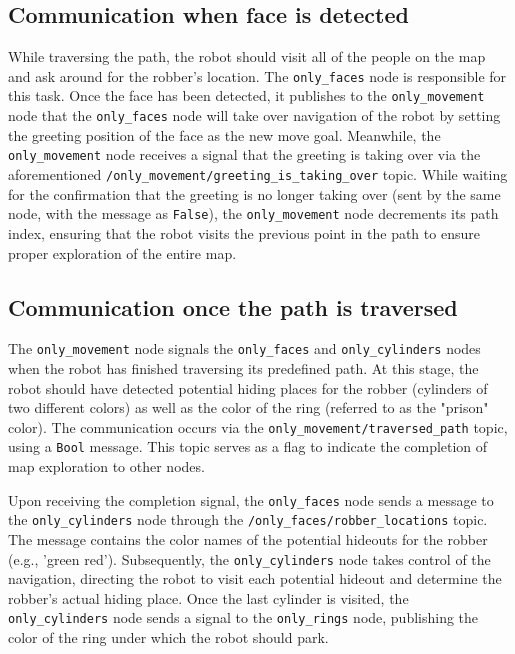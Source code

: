 \documentclass{article}
\begin{document}
\subsection{Communication when face is detected}

While traversing the path, the robot should visit all of the people on the map and ask around for the robber's location. The \texttt{only\_faces} node is responsible for this task. Once the face has been detected, it publishes to the \texttt{only\_movement} node that the \texttt{only\_faces} node will take over navigation of the robot by setting the greeting position of the face as the new move goal. Meanwhile, the \texttt{only\_movement} node receives a signal that the greeting is taking over via the aforementioned \texttt{/only\_movement/greeting\_is\_taking\_over} topic. While waiting for the confirmation that the greeting is no longer taking over (sent by the same node, with the message as \texttt{False}), the \texttt{only\_movement} node decrements its path index, ensuring that the robot visits the previous point in the path to ensure proper exploration of the entire map.


\subsection{Communication once the path is traversed}

The \texttt{only\_movement} node signals the \texttt{only\_faces} and \texttt{only\_cylinders} nodes when the robot has finished traversing its predefined path. At this stage, the robot should have detected potential hiding places for the robber (cylinders of two different colors) as well as the color of the ring (referred to as the "prison" color). The communication occurs via the \texttt{only\_movement/traversed\_path} topic, using a \texttt{Bool} message. This topic serves as a flag to indicate the completion of map exploration to other nodes.

Upon receiving the completion signal, the \texttt{only\_faces} node sends a message to the \texttt{only\_cylinders} node through the \texttt{/only\_faces/robber\_locations} topic. The message contains the color names of the potential hideouts for the robber (e.g., 'green red'). Subsequently, the \texttt{only\_cylinders} node takes control of the navigation, directing the robot to visit each potential hideout and determine the robber's actual hiding place. Once the last cylinder is visited, the \texttt{only\_cylinders} node sends a signal to the \texttt{only\_rings} node, publishing the color of the ring under which the robot should park.
\end{document}
